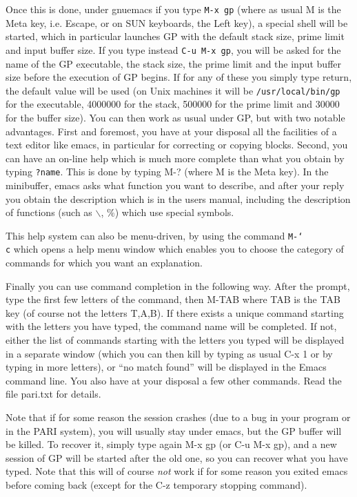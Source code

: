 Once this is done, under gnuemacs if you type {\tt M-x gp} (where as usual M is the
Meta key, i.e. Escape, or on SUN keyboards, the Left key), a special shell
will be started, which in particular launches GP with the default stack size,
prime limit and input buffer size. If you type instead {\tt C-u M-x gp},
you will be asked for the name of the GP executable, the stack size, the prime limit
and the input buffer size before the execution of GP begins. If for any of these
you simply type return, the default value will be used (on Unix machines it will be
{\tt /usr/local/bin/gp} for the executable, 4000000 for the stack, 500000 for the
prime limit and 30000 for the buffer size).
\smallskip
You can then work as usual under GP, but with two notable advantages.
First and foremost, you have at your
disposal all the facilities of a text editor like emacs, in particular for
correcting or copying blocks. Second, you can have an on-line help which is
much more complete than what you obtain by typing {\tt ?name}.
This is done by typing M-? (where M is the Meta key). In the minibuffer,
emacs asks what function you want to describe, and after your reply you obtain
the description which is in the users manual, including the description of
functions (such as $\backslash$, $\%$) which use special symbols.

This help system can also be menu-driven, by using the command {\tt M-\char`\\ c}
which opens a help menu window which enables you to choose the category
of commands for which you want an explanation.

Finally you can use command completion in the following way. After the prompt,
type the first few letters of the command, then M-TAB where TAB is the TAB key
(of course not the letters T,A,B). If there exists a unique command starting
with the letters you have typed, the command name will be completed. If not,
either the list of commands starting with the letters you typed will be
displayed in a separate window (which you can then kill by typing as usual
C-x 1 or by typing in more letters), or ``no match found'' will be displayed
in the Emacs command line.
\smallskip
You also have at your disposal a few other commands. Read the file
pari.txt for details.

Note that if for some reason the session crashes (due to a bug in your program
or in the PARI system), you will usually stay under emacs, but the GP buffer
will be killed. To recover it, simply type again M-x gp (or C-u M-x gp), and
a new session of GP will be started after the old one, so you can recover
what you have typed. Note that this will of course {\sl not} work if for some
reason you exited emacs before coming back (except for the C-z temporary
stopping command).


\vfill\eject

